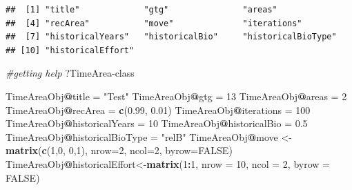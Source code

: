 \documentclass[
]{book}
\newenvironment{Shaded}{\begin{snugshade}}{\end{snugshade}}
\newcommand{\AttributeTok}[1]{\textcolor[rgb]{0.13,0.29,0.53}{#1}}
\newcommand{\CommentTok}[1]{\textcolor[rgb]{0.56,0.35,0.01}{\textit{#1}}}
\newcommand{\ConstantTok}[1]{\textcolor[rgb]{0.56,0.35,0.01}{#1}}
\newcommand{\DecValTok}[1]{\textcolor[rgb]{0.00,0.00,0.81}{#1}}
\newcommand{\FloatTok}[1]{\textcolor[rgb]{0.00,0.00,0.81}{#1}}
\newcommand{\FunctionTok}[1]{\textcolor[rgb]{0.13,0.29,0.53}{\textbf{#1}}}
\newcommand{\NormalTok}[1]{#1}
\newcommand{\OtherTok}[1]{\textcolor[rgb]{0.56,0.35,0.01}{#1}}
\newcommand{\SpecialCharTok}[1]{\textcolor[rgb]{0.81,0.36,0.00}{\textbf{#1}}}
\newcommand{\StringTok}[1]{\textcolor[rgb]{0.31,0.60,0.02}{#1}}
\begin{document}
\begin{verbatim}
##  [1] "title"             "gtg"               "areas"            
##  [4] "recArea"           "move"              "iterations"       
##  [7] "historicalYears"   "historicalBio"     "historicalBioType"
## [10] "historicalEffort"
\end{verbatim}

\begin{Shaded}
\begin{Highlighting}[]
\CommentTok{\#getting help}
\NormalTok{?}\StringTok{\textasciigrave{}}\AttributeTok{TimeArea{-}class}\StringTok{\textasciigrave{}}  
\end{Highlighting}
\end{Shaded}

\begin{Shaded}
\begin{Highlighting}[]
\NormalTok{TimeAreaObj}\SpecialCharTok{@}\NormalTok{title }\OtherTok{=} \StringTok{"Test"}
\NormalTok{TimeAreaObj}\SpecialCharTok{@}\NormalTok{gtg }\OtherTok{=} \DecValTok{13}
\NormalTok{TimeAreaObj}\SpecialCharTok{@}\NormalTok{areas }\OtherTok{=} \DecValTok{2}
\NormalTok{TimeAreaObj}\SpecialCharTok{@}\NormalTok{recArea }\OtherTok{=} \FunctionTok{c}\NormalTok{(}\FloatTok{0.99}\NormalTok{, }\FloatTok{0.01}\NormalTok{)}
\NormalTok{TimeAreaObj}\SpecialCharTok{@}\NormalTok{iterations }\OtherTok{=} \DecValTok{100}
\NormalTok{TimeAreaObj}\SpecialCharTok{@}\NormalTok{historicalYears }\OtherTok{=} \DecValTok{10}
\NormalTok{TimeAreaObj}\SpecialCharTok{@}\NormalTok{historicalBio }\OtherTok{=} \FloatTok{0.5}
\NormalTok{TimeAreaObj}\SpecialCharTok{@}\NormalTok{historicalBioType }\OtherTok{=} \StringTok{"relB"}
\NormalTok{TimeAreaObj}\SpecialCharTok{@}\NormalTok{move }\OtherTok{\textless{}{-}} \FunctionTok{matrix}\NormalTok{(}\FunctionTok{c}\NormalTok{(}\DecValTok{1}\NormalTok{,}\DecValTok{0}\NormalTok{, }\DecValTok{0}\NormalTok{,}\DecValTok{1}\NormalTok{), }\AttributeTok{nrow=}\DecValTok{2}\NormalTok{, }\AttributeTok{ncol=}\DecValTok{2}\NormalTok{, }\AttributeTok{byrow=}\ConstantTok{FALSE}\NormalTok{)}
\NormalTok{TimeAreaObj}\SpecialCharTok{@}\NormalTok{historicalEffort}\OtherTok{\textless{}{-}}\FunctionTok{matrix}\NormalTok{(}\DecValTok{1}\SpecialCharTok{:}\DecValTok{1}\NormalTok{, }\AttributeTok{nrow =} \DecValTok{10}\NormalTok{, }\AttributeTok{ncol =} \DecValTok{2}\NormalTok{, }\AttributeTok{byrow =} \ConstantTok{FALSE}\NormalTok{)}
\end{Highlighting}
\end{Shaded}
\end{document}
